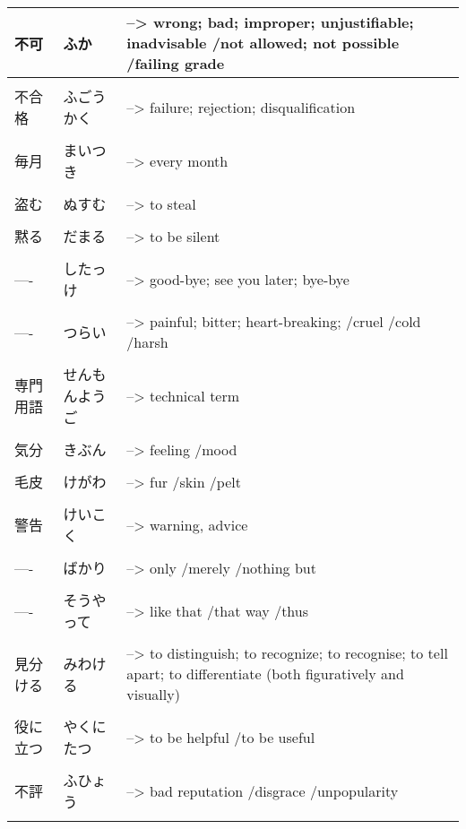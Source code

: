 \documentclass{article}
\begin{document}
\begin{tabular}{ l | l p{14cm}  }
不可 & ふか &--> wrong; bad; improper; unjustifiable; inadvisable /not allowed; not possible /failing grade \\ \hline\\[-1em]
不合格 & ふごうかく &--> failure; rejection; disqualification \\ \hline\\[-1em]
毎月 & まいつき &--> every month \\ \hline\\[-1em]
盗む & ぬすむ &--> to steal \\ \hline\\[-1em]
黙る & だまる &--> to be silent \\ \hline\\[-1em]
---- & したっけ &--> good-bye; see you later; bye-bye \\ \hline\\[-1em]
---- & つらい &--> painful; bitter; heart-breaking; /cruel /cold /harsh \\ \hline\\[-1em]
専門用語 & せんもんようご &--> technical term \\ \hline\\[-1em]
気分 & きぶん &--> feeling /mood \\ \hline\\[-1em]
毛皮 & けがわ &--> fur /skin /pelt \\ \hline\\[-1em]
警告 & けいこく&--> warning, advice \\ \hline\\[-1em]
---- & ばかり &--> only /merely /nothing but \\ \hline\\[-1em]
---- & そうやって &--> like that /that way /thus \\ \hline\\[-1em]
見分ける & みわける &--> to distinguish; to recognize; to recognise; to tell apart; to differentiate (both figuratively and visually) \\ \hline\\[-1em]
役に立つ & やくにたつ &--> to be helpful /to be useful \\ \hline\\[-1em]
不評 & ふひょう &--> bad reputation /disgrace /unpopularity \\ \hline\\[-1em]
\end{tabular}\\
\end{document}
